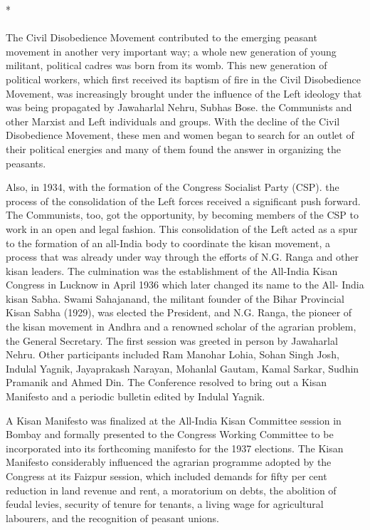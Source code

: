 \begin{multicols}{2}
\begin{center}*\end{center}

\paragraph*{}

The Civil Disobedience Movement contributed to the emerging peasant movement in another very important way; a whole new generation of young militant, political cadres was born from its womb. This new generation of political workers, which first received its baptism of fire in the Civil Disobedience Movement, was increasingly brought under the influence of the Left ideology that was being propagated by Jawaharlal Nehru, Subhas Bose. the Communists and other Marxist and Left individuals and groups. With the decline of the Civil Disobedience Movement, these men and women began to search for an outlet of their political energies and many of them found the answer in organizing the peasants.

Also, in 1934, with the formation of the Congress Socialist Party (CSP). the process of the consolidation of the Left forces received a significant push forward. The Communists, too, got the opportunity, by becoming members of the CSP to work in an open and legal fashion. This consolidation of the Left acted as a spur to the formation of an all-India body to coordinate the kisan movement, a process that was already under way through the efforts of N.G. Ranga and other kisan leaders. The culmination was the establishment of the All-India Kisan Congress in Lucknow in April 1936 which later changed its name to the All- India kisan Sabha. Swami Sahajanand, the militant founder of the Bihar Provincial Kisan Sabha (1929), was elected the President, and N.G. Ranga, the pioneer of the kisan movement in Andhra and a renowned scholar of the agrarian problem, the General Secretary. The first session was greeted in person by Jawaharlal Nehru. Other participants included Ram Manohar Lohia, Sohan Singh Josh, Indulal Yagnik, Jayaprakash Narayan, Mohanlal Gautam, Kamal Sarkar, Sudhin Pramanik and Ahmed Din. The Conference resolved to bring out a Kisan Manifesto and a periodic bulletin edited by Indulal Yagnik.

A Kisan Manifesto was finalized at the All-India Kisan Committee session in Bombay and formally presented to the Congress Working Committee to be incorporated into its forthcoming manifesto for the 1937 elections. The Kisan Manifesto considerably influenced the agrarian programme adopted by the Congress at its Faizpur session, which included demands for fifty per cent reduction in land revenue and rent, a moratorium on debts, the abolition of feudal levies, security of tenure for tenants, a living wage for agricultural labourers, and the recognition of peasant unions.


\end{multicols}

